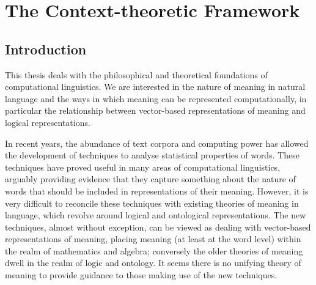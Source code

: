 
%

%

\part{The Context-theoretic Framework}
\chapter{Introduction}

This thesis deals with the philosophical and theoretical foundations of computational linguistics. We are interested in the nature of meaning in natural language and the ways in which meaning can be represented computationally, in particular the relationship between vector-based representations of meaning and logical representations.

In recent years, the abundance of text corpora and computing power has allowed the development of techniques to analyse statistical properties of words. These techniques have proved useful in many areas of computational linguistics, arguably providing evidence that they capture something about the nature of words that should be included in representations of their meaning. However, it is very difficult to reconcile these techniques with existing theories of meaning in language, which revolve around logical and ontological representations. The new techniques, almost without exception, can be viewed as dealing with vector-based representations of meaning, placing meaning (at least at the word level) within the realm of mathematics and algebra; conversely the older theories of meaning dwell in the realm of logic and ontology. It seems there is no unifying theory of meaning to provide guidance to those making use of the new techniques.

